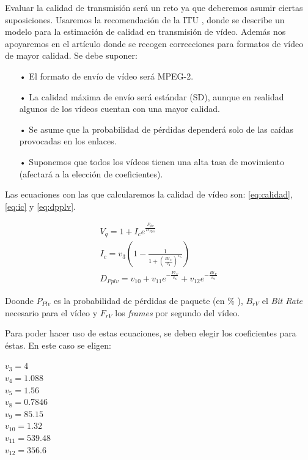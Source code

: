 \documentclass[a4paper,11pt]{book}
\begin{document}
 Evaluar la calidad de transmisión será un reto ya que deberemos asumir ciertas suposiciones. Usaremos la recomendación de la \ac{ITU} \cite{g1070}, donde se describe un modelo para la estimación de calidad en transmisión de vídeo. Además nos apoyaremos en el artículo \cite{joskowicz2009enhancements} donde se recogen correcciones para formatos de vídeo de mayor calidad. Se debe suponer:

\begin{itemize}
\item[•] El formato de envío de vídeo será MPEG-2.
\item[•] La calidad máxima de envío será estándar (SD), aunque en realidad algunos de los vídeos cuentan con una mayor calidad.
\item[•] Se asume que la probabilidad de pérdidas dependerá solo de las caídas provocadas en los enlaces.
\item[•] Suponemos que todos los vídeos tienen una alta tasa de movimiento (afectará a la elección de coeficientes). 
\end{itemize}

Las ecuaciones con las que calcularemos la calidad de vídeo son: \ref{eq:calidad}, \ref{eq:ic} y \ref{eq:dpplv}.

\begin{subequations}
\begin{align}
V_{q}=1+I_{c}e^{\frac{P_{plv}}{D_{Pplv}}}\label{eq:calidad}\\
I_{c}=v_{3}\left(1-\frac{1}{1+\left(\frac{Br_{V}}{v_{4}}\right)^{v_{5}}}\right)\label{eq:ic}\\
D_{Pplv}=v_{10}+v_{11}e^{-\frac{Fr_{V}}{v_{8}}}+v_{12}e^{-\frac{Br_{V}}{v_{9}}}\label{eq:dpplv}
\end{align}
\end{subequations}

Doonde $P_{Plv}$ es la probabilidad de pérdidas de paquete (en $\%$ ), $B_{rV}$ el \textit{Bit Rate} necesario para el vídeo y $F_{rV}$ los \emph{frames} por segundo del vídeo. 

Para poder hacer uso de estas ecuaciones, se deben elegir los coeficientes para éstas. En este caso se eligen:

\begin{center}
$v_{3}=4$ \\
$v_{4}=1.088$ \\
$v_{5}=1.56$ \\
$v_{8}=0.7846$ \\
$v_{9}=85.15$ \\
$v_{10}=1.32$ \\
$v_{11}=539.48$ \\
$v_{12}=356.6$ 
\end{center}
\end{document}
